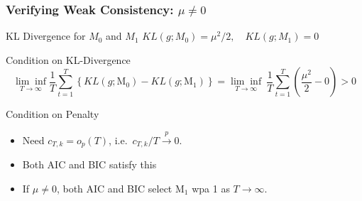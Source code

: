 %
%
%
%
%
\begin{frame}
  \frametitle{Verifying Weak Consistency: $\mu \neq 0$}

  \begin{block}{KL Divergence for $M_0$ and $M_1$}
$KL(g;M_0) = \mu^2/2, \quad KL(g;M_1) = 0$
  \end{block}

  \begin{block}{Condition on KL-Divergence}
  \small
  \vspace{-2em}
  \[
    \underset{T\rightarrow \infty}{\lim\inf} \frac{1}{T}\sum_{t = 1}^T \left\{ KL(g; \text{M}_0) - KL(g;\text{M}_1) \right\} = \underset{T\rightarrow \infty}{\lim\inf}\ \frac{1}{T}\sum_{t = 1}^T  \left(\frac{\mu^2}{2} - 0\right) > 0
  \]
\end{block}

\pause

\begin{block}{Condition on Penalty}
  \begin{itemize}
    \item Need $c_{T,k} = o_p(T)$, i.e.\ $c_{T,k}/T \overset{p}{\rightarrow} 0$.  
    \item Both AIC and BIC satisfy this
    \item If $\mu \neq 0$, both AIC and BIC select $\text{M}_1$ wpa 1 as $T\rightarrow \infty$.
  \end{itemize}
\end{block}
\end{frame}
